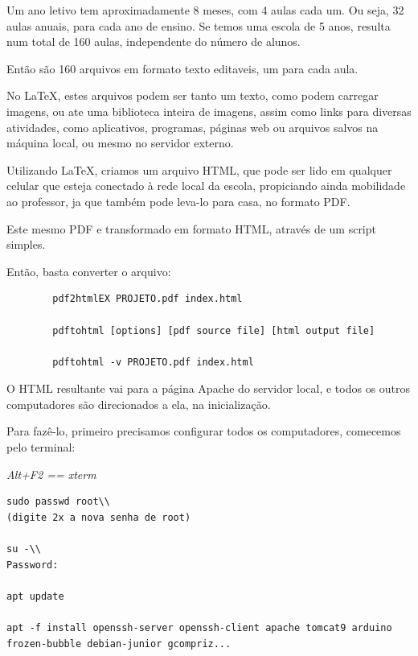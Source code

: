 \begin{multicols}{2}
	Um ano letivo tem aproximadamente 8 meses, com 4 aulas cada um. Ou seja, 32 aulas anuais, para cada ano de ensino. Se temos uma escola de 5 anos, resulta num total de 160 aulas, independente do número de alunos.
	
	Então são 160 arquivos em formato texto editaveis, um para cada aula.
	
	No \LaTeX, estes arquivos podem ser tanto um texto, como podem carregar imagens, ou ate uma biblioteca inteira de imagens, assim como links para diversas atividades, como aplicativos, programas, páginas web ou arquivos salvos na máquina local, ou mesmo no servidor externo.
	
	Utilizando \LaTeX, criamos um arquivo HTML, que pode ser lido em qualquer celular que esteja conectado à rede local da escola, propiciando ainda mobilidade ao professor, ja que também pode leva-lo para casa, no formato PDF.
	
	Este mesmo PDF e transformado em formato HTML, através de um script simples.
	
	
	Então, basta converter o arquivo:
	
	\begin{lstlisting}
		pdf2htmlEX PROJETO.pdf index.html
		
		pdftohtml [options] [pdf source file] [html output file]
		
		pdftohtml -v PROJETO.pdf index.html
	\end{lstlisting}
	
	
	O HTML resultante vai para a página Apache do servidor local, e todos os outros computadores são direcionados a ela, na inicialização.
	
	Para fazê-lo, primeiro precisamos configurar todos os computadores, comecemos pelo terminal:
	
	\textit{Alt+F2 == xterm}
	
	\begin{lstlisting}
sudo passwd root\\
(digite 2x a nova senha de root)
		
su -\\
Password:
		
apt update
		
apt -f install openssh-server openssh-client apache tomcat9 arduino frozen-bubble debian-junior gcompriz...
		

\end{lstlisting}
\end{multicols}
